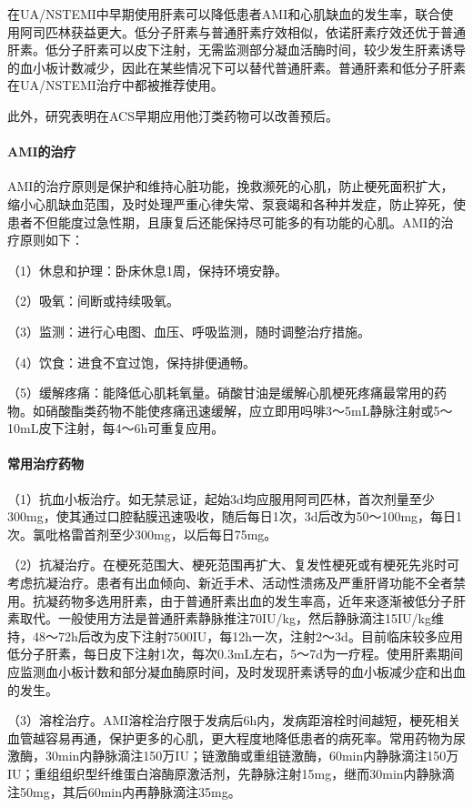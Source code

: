 在UA/NSTEMI中早期使用肝素可以降低患者AMI和心肌缺血的发生率，联合使用阿司匹林获益更大。低分子肝素与普通肝素疗效相似，依诺肝素疗效还优于普通肝素。低分子肝素可以皮下注射，无需监测部分凝血活酶时间，较少发生肝素诱导的血小板计数减少，因此在某些情况下可以替代普通肝素。普通肝素和低分子肝素在UA/NSTEMI治疗中都被推荐使用。

此外，研究表明在ACS早期应用他汀类药物可以改善预后。
\paragraph{AMI的治疗}

AMI的治疗原则是保护和维持心脏功能，挽救濒死的心肌，防止梗死面积扩大，缩小心肌缺血范围，及时处理严重心律失常、泵衰竭和各种并发症，防止猝死，使患者不但能度过急性期，且康复后还能保持尽可能多的有功能的心肌。AMI的治疗原则如下：

（1）休息和护理：卧床休息1周，保持环境安静。

（2）吸氧：间断或持续吸氧。

（3）监测：进行心电图、血压、呼吸监测，随时调整治疗措施。

（4）饮食：进食不宜过饱，保持排便通畅。

（5）缓解疼痛：能降低心肌耗氧量。硝酸甘油是缓解心肌梗死疼痛最常用的药物。如硝酸酯类药物不能使疼痛迅速缓解，应立即用吗啡3～5mL静脉注射或5～10mL皮下注射，每4～6h可重复应用。
\paragraph{常用治疗药物}

（1）抗血小板治疗。如无禁忌证，起始3d均应服用阿司匹林，首次剂量至少300mg，使其通过口腔黏膜迅速吸收，随后每日1次，3d后改为50～100mg，每日1次。氯吡格雷首剂至少300mg，以后每日75mg。

（2）抗凝治疗。在梗死范围大、梗死范围再扩大、复发性梗死或有梗死先兆时可考虑抗凝治疗。患者有出血倾向、新近手术、活动性溃疡及严重肝肾功能不全者禁用。抗凝药物多选用肝素，由于普通肝素出血的发生率高，近年来逐渐被低分子肝素取代。一般使用方法是普通肝素静脉推注70IU/kg，然后静脉滴注15IU/kg维持，48～72h后改为皮下注射7500IU，每12h一次，注射2～3d。目前临床较多应用低分子肝素，每日皮下注射1次，每次0.3mL左右，5～7d为一疗程。使用肝素期间应监测血小板计数和部分凝血酶原时间，及时发现肝素诱导的血小板减少症和出血的发生。

（3）溶栓治疗。AMI溶栓治疗限于发病后6h内，发病距溶栓时间越短，梗死相关血管越容易再通，保护更多的心肌，更大程度地降低患者的病死率。常用药物为尿激酶，30min内静脉滴注150万IU；链激酶或重组链激酶，60min内静脉滴注150万IU；重组组织型纤维蛋白溶酶原激活剂，先静脉注射15mg，继而30min内静脉滴注50mg，其后60min内再静脉滴注35mg。


